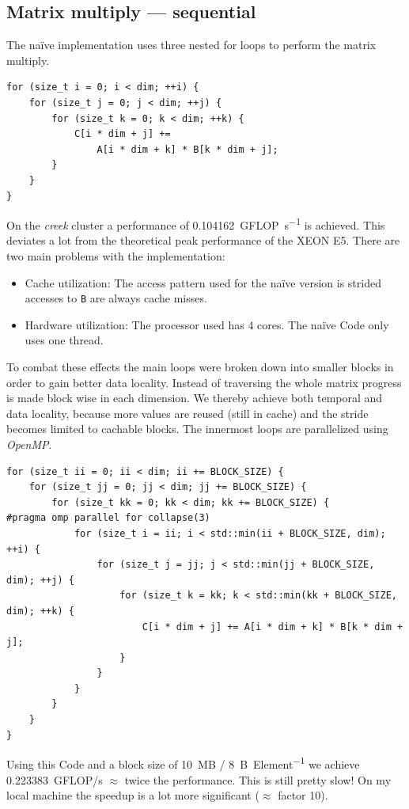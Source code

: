 \documentclass[]{scrartcl}
\begin{document}
\subsection{Matrix multiply --- sequential}
The naïve implementation uses three nested for loops to perform the matrix multiply.
\lstset{language=C++}
\begin{verbatim}
for (size_t i = 0; i < dim; ++i) {
	for (size_t j = 0; j < dim; ++j) {
		for (size_t k = 0; k < dim; ++k) {
			C[i * dim + j] +=
			    A[i * dim + k] * B[k * dim + j];
		}
	}
}
\end{verbatim}
On the \emph{creek} cluster a performance of \SI{0.104162}{GFLOP\per\second} is achieved.
This deviates a lot from the theoretical peak performance of the XEON E5.
There are two main problems with the implementation:
\begin{itemize}
	\item Cache utilization: The access pattern used for the naïve version
		is strided accesses to \texttt{B} are always cache misses.
	\item Hardware utilization: The processor used has 4 cores. The
		naïve Code only uses one thread.
\end{itemize}
To combat these effects the main loops were broken down into smaller blocks in order
to gain better data locality. Instead of traversing the whole matrix progress is made
block wise in each dimension. We thereby achieve both temporal and data locality, because
more values are reused (still in cache) and the stride becomes limited to cachable blocks.
The innermost loops are parallelized using \emph{OpenMP}.
\begin{verbatim}
for (size_t ii = 0; ii < dim; ii += BLOCK_SIZE) {
    for (size_t jj = 0; jj < dim; jj += BLOCK_SIZE) {
        for (size_t kk = 0; kk < dim; kk += BLOCK_SIZE) {
#pragma omp parallel for collapse(3)
            for (size_t i = ii; i < std::min(ii + BLOCK_SIZE, dim); ++i) {
                for (size_t j = jj; j < std::min(jj + BLOCK_SIZE, dim); ++j) {
                    for (size_t k = kk; k < std::min(kk + BLOCK_SIZE, dim); ++k) {
                        C[i * dim + j] += A[i * dim + k] * B[k * dim + j];
                    }
                }
            }
        }
    }
}
\end{verbatim}
Using this Code and a block size of \SI{10}{\mega B} / \SI{8}{B\per Element}
we achieve \SI{0.223383}{GFLOP/s} $\approx$ twice the performance.
This is still pretty slow! On my local machine the speedup is a lot more significant ($\approx$ factor 10).
\end{document}
